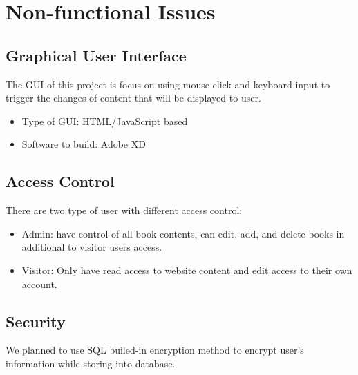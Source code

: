\documentclass[titlepage]{article}
\begin{document}
	\section{Non-functional Issues}
	\subsection{Graphical User Interface}
	The GUI of this project is focus on using mouse click and keyboard input to trigger the changes of content that will be displayed to user.
	\begin{itemize}
		\item Type of GUI: HTML/JavaScript based
		\item Software to build: Adobe XD
	\end{itemize}	
	\subsection{Access Control}
	There are two type of user with different access control:
	\begin{itemize}
		\item Admin: have control of all book contents, can edit, add, and delete books in additional to visitor users access.
		\item Visitor: Only have read access to website content and edit access to their own account. 
	\end{itemize}
	\subsection{Security}
	We planned to use SQL builed-in encryption method to encrypt user's information while storing into database. 
\end{document}
